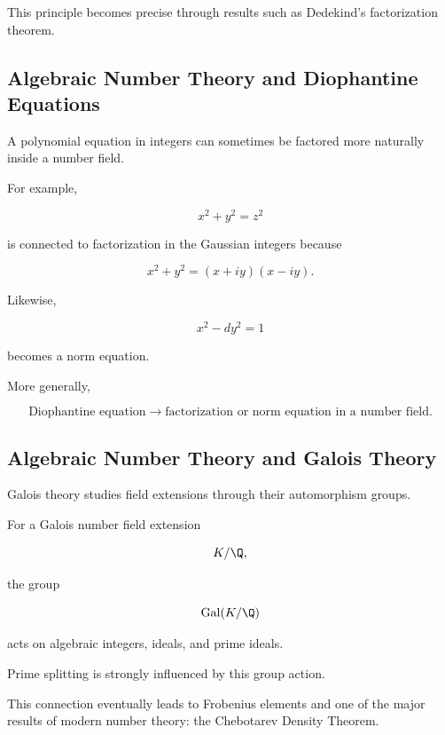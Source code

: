 This principle becomes precise through results such as Dedekind's
factorization theorem.

\subsection{Algebraic Number Theory and Diophantine Equations}
\label{subsec:algebraic-number-theory-diophantine}

A polynomial equation in integers can sometimes be factored more naturally
inside a number field.

For example,

\[ x^2+y^2=z^2 \]

is connected to factorization in the Gaussian integers because

\[ x^2+y^2=(x+iy)(x-iy). \]

Likewise,

\[ x^2-dy^2=1 \]

becomes a norm equation.

More generally,

\[
\boxed{
\text{Diophantine equation}
\longrightarrow
\text{factorization or norm equation in a number field}.
}
\]

\subsection{Algebraic Number Theory and Galois Theory}
\label{subsec:algebraic-number-theory-galois}

Galois theory studies field extensions through their automorphism groups.

For a Galois number field extension

\[ K/\Q, \]

the group

\[ \operatorname{Gal}(K/\Q) \]

acts on algebraic integers, ideals, and prime ideals.

Prime splitting is strongly influenced by this group action.

This connection eventually leads to Frobenius elements and one of the major
results of modern number theory: the Chebotarev Density Theorem.

